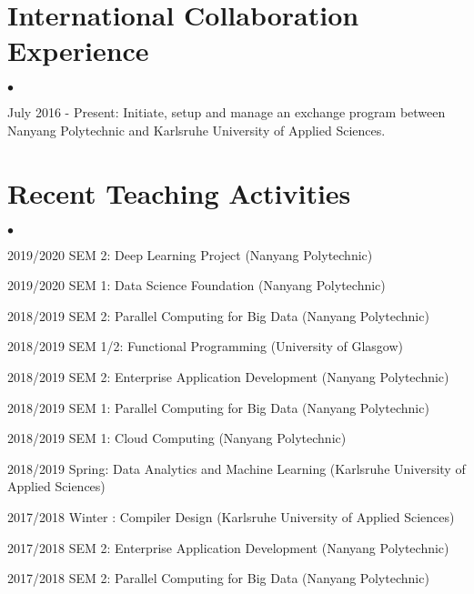 \documentclass[margin,line]{res}
\newenvironment{list2}{
  \begin{list}{$\bullet$}{%
      \setlength{\itemsep}{0in}
      \setlength{\parsep}{0in} \setlength{\parskip}{0in}
      \setlength{\topsep}{0in} \setlength{\partopsep}{0in} 
      \setlength{\leftmargin}{0.2in}}}{\end{list}}
\newcommand{\longversion}[1]{}
\begin{document}
\begin{resume}
\section{\sc International Collaboration Experience}
\begin{list2} 
\item  July 2016 - Present: Initiate, setup and manage an exchange program between Nanyang
                       Polytechnic and Karlsruhe University of Applied Sciences.  
\end{list2}

\section{\sc Recent Teaching Activities}
\begin{list2}
\item 2019/2020 SEM 2: Deep Learning Project (Nanyang Polytechnic)
\item 2019/2020 SEM 1: Data Science Foundation (Nanyang Polytechnic)
\item 2018/2019 SEM 2: Parallel Computing for Big Data (Nanyang Polytechnic)
\item 2018/2019 SEM 1/2: Functional Programming (University of Glasgow)
\item 2018/2019 SEM 2: Enterprise Application Development (Nanyang Polytechnic)
\item 2018/2019 SEM 1: Parallel Computing for Big Data (Nanyang Polytechnic)
\item 2018/2019 SEM 1: Cloud Computing (Nanyang Polytechnic)
\item 2018/2019 Spring: Data Analytics and Machine Learning  (Karlsruhe University of Applied Sciences)
\item 2017/2018 Winter : Compiler Design (Karlsruhe University of Applied Sciences)
\item 2017/2018 SEM 2: Enterprise Application Development (Nanyang Polytechnic)
\item 2017/2018 SEM 2: Parallel Computing for Big Data (Nanyang Polytechnic)
\end{list2}



\end{resume}
\end{document}

